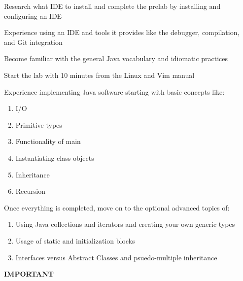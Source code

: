 \documentclass[../../main.tex]{subfiles}
\begin{document}
\begin{steps}
   \item Research what IDE to install and complete the prelab by installing and configuring an IDE
   \item Experience using an IDE and tools it provides like the debugger, compilation, and Git
      integration
   \item Become familiar with the general Java vocabulary and idiomatic practices
   \item Start the lab with 10 minutes from the Linux and Vim manual
   \item Experience implementing Java software starting with basic concepts like:
   \begin{enumerate}[label=\Alph*.]
         \item I/O
         \item Primitive types
         \item Functionality of main
         \item Instantiating class objects
         \item Inheritance
         \item Recursion
      \end{enumerate}
   \item Once everything is completed, move on to the optional advanced topics of:
   \begin{enumerate}[label=\Alph*.]
         \item Using Java collections and iterators and creating your own generic types
         \item Usage of static and initialization blocks
         \item Interfaces versus Abstract Classes and psuedo-multiple inheritance
      \end{enumerate}
\end{steps}

\vspace{5cm}

\begin{center}
   {\Huge\bfseries IMPORTANT}
\end{center}

\end{document}

